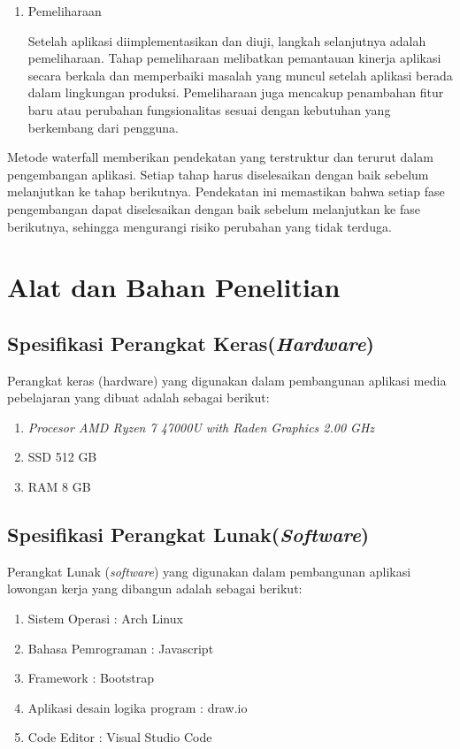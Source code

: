 \begin{enumerate}[leftmargin=1cm, itemindent=0.6cm,labelwidth=15pt, labelsep=5pt, listparindent=1cm,align=left]
\item Pemeliharaan

    Setelah aplikasi diimplementasikan dan diuji, langkah selanjutnya adalah pemeliharaan. Tahap pemeliharaan melibatkan pemantauan kinerja aplikasi secara berkala dan memperbaiki masalah yang muncul setelah aplikasi berada dalam lingkungan produksi. Pemeliharaan juga mencakup penambahan fitur baru atau perubahan fungsionalitas sesuai dengan kebutuhan yang berkembang dari pengguna.

\end{enumerate}

Metode waterfall memberikan pendekatan yang terstruktur dan terurut dalam pengembangan aplikasi. Setiap tahap harus diselesaikan dengan baik sebelum melanjutkan ke tahap berikutnya. Pendekatan ini memastikan bahwa setiap fase pengembangan dapat diselesaikan dengan baik sebelum melanjutkan ke fase berikutnya, sehingga mengurangi risiko perubahan yang tidak terduga.

\section{Alat dan Bahan Penelitian}
\subsection{Spesifikasi Perangkat Keras(\textit{Hardware})}
    Perangkat keras (hardware) yang digunakan dalam pembangunan aplikasi media pebelajaran yang dibuat adalah sebagai berikut:
\begin{enumerate}
    \item \textit{Procesor AMD Ryzen 7 47000U with Raden Graphics 2.00 GHz}
    \item SSD 512 GB
    \item RAM 8 GB
\end{enumerate}

\subsection{Spesifikasi Perangkat Lunak(\textit{Software})}
    Perangkat Lunak (\textit{software}) yang digunakan dalam pembangunan aplikasi lowongan kerja yang dibangun adalah sebagai berikut:

\begin{enumerate}
    \item Sistem Operasi : Arch Linux
    \item Bahasa Pemrograman : Javascript
    \item Framework : Bootstrap
    \item Aplikasi desain logika program : draw.io
    \item Code Editor : Visual Studio Code
\end{enumerate}
